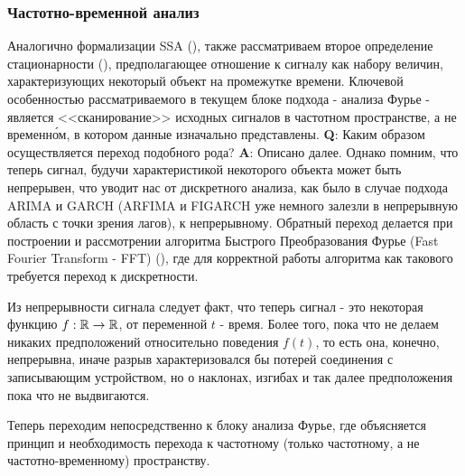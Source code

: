 \subsubsection{Частотно-временной анализ} 

Аналогично формализации SSA (), также рассматриваем  второе определение стационарности (), предполагающее отношение к сигналу как набору величин, характеризующих некоторый объект на промежутке времени. Ключевой особенностью рассматриваемого в текущем блоке подхода - анализа Фурье - является <<сканирование>> исходных сигналов в частотном пространстве, а не временн\'{о}м, в котором данные изначально представлены. \textbf{Q}: Каким образом осуществляется переход подобного рода? \textbf{A}: Описано далее. Однако помним, что теперь сигнал, будучи характеристикой некоторого объекта может быть непрерывен, что уводит нас от дискретного анализа, как было в случае подхода ARIMA и GARCH (ARFIMA и FIGARCH уже немного залезли в непрерывную область с точки зрения лагов), к непрерывному. Обратный переход делается при построении и рассмотрении алгоритма Быстрого Преобразования Фурье (Fast Fourier Transform - FFT) (), где для корректной работы алгоритма как такового требуется переход к дискретности. 

Из непрерывности сигнала следует факт, что теперь сигнал - это некоторая функцию $f: \mathbb{R} \to \mathbb{R}$, от переменной $t$ - время. Более того, пока что не делаем никаких предположений относительно поведения $f(t)$, то есть она, конечно, непрерывна, иначе разрыв характеризовался бы потерей соединения с записывающим устройством, но о наклонах, изгибах и так далее предположения пока что не выдвигаются.

Теперь переходим непосредственно к блоку анализа Фурье, где объясняется принцип и необходимость перехода к частотному (только частотному, а не частотно-временному) пространству.





